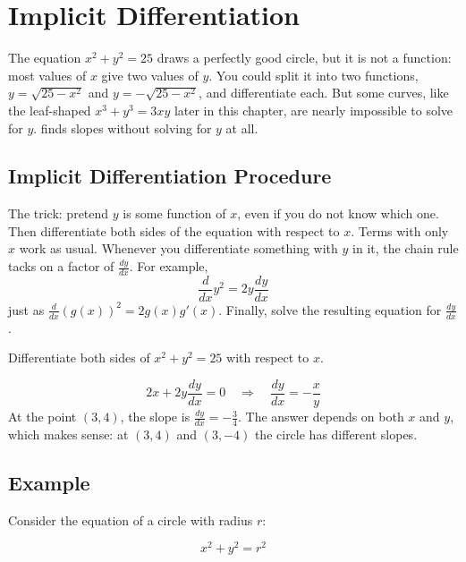 \chapter{Implicit Differentiation}

The equation $x^2 + y^2 = 25$ draws a perfectly good circle, but it is
not a function: most values of $x$ give two values of $y$. You could
split it into two functions, $y = \sqrt{25 - x^2}$ and $y = -\sqrt{25 -
x^2}$, and differentiate each. But some curves, like the leaf-shaped
$x^3 + y^3 = 3xy$ later in this chapter, are nearly impossible to solve
for $y$. 
finds slopes without solving for $y$ at all.

\section{Implicit Differentiation Procedure}

The trick: pretend $y$ is some function of $x$, even if you do not know
which one. Then differentiate both sides of the equation with respect to
$x$. Terms with only $x$ work as usual. Whenever you differentiate
something with $y$ in it, the chain rule tacks
on a factor of $\frac{dy}{dx}$. For example,
$$\frac{d}{dx}y^2 = 2y\frac{dy}{dx}$$
just as $\frac{d}{dx}(g(x))^2 = 2g(x)g'(x)$. Finally, solve the resulting
equation for $\frac{dy}{dx}$.

\begin{Worked}
\begin{Problem}
Differentiate both sides of
$x^2 + y^2 = 25$ with respect to $x$.
\end{Problem}
\begin{Solution}
$$2x + 2y\frac{dy}{dx} = 0 \quad \Longrightarrow \quad \frac{dy}{dx} = -\frac{x}{y}$$
At the point $(3, 4)$, the slope is $\frac{dy}{dx} = -\frac{3}{4}$. The
answer depends on both $x$ and $y$, which makes sense: at $(3, 4)$ and $(3,
-4)$ the circle has different slopes.
\end{Solution}
\end{Worked}

\section{Example}

Consider the equation of a circle with radius $r$:

$$x^2 + y^2 = r^2$$


